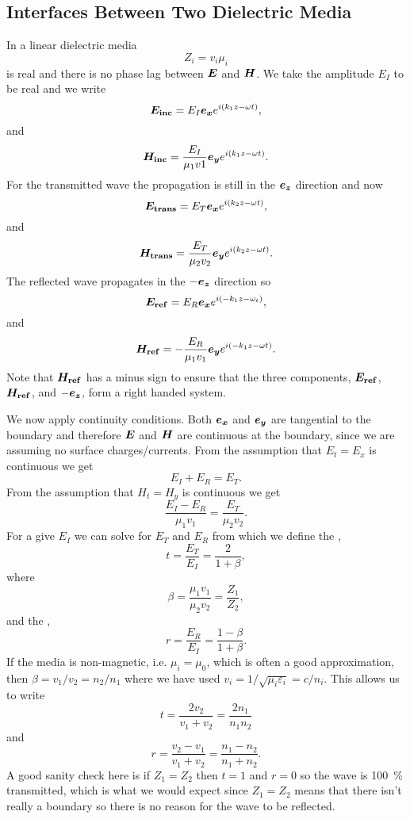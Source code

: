     \subsection{Interfaces Between Two Dielectric Media}
    In a linear dielectric media
    \[Z_i = v_i\mu_i\]
    is real and there is no phase lag between \(\bm{E}\) and \(\bm{H}\).
    We take the amplitude \(E_I\) to be real and we write
    \[\bm{E_{\mathrm{inc}}} = E_I\bm{e_{x}}e^{i(k_1z - \omega t)},\]
    and
    \[\bm{H_{\mathrm{inc}}} = \frac{E_I}{\mu_1v1}\bm{e_{y}}e^{i(k_1z - \omega t)}.\]
    For the transmitted wave the propagation is still in the \(\bm{e_{z}}\) direction and now
    \[\bm{E_{\mathrm{trans}}} = E_T\bm{e_{x}}e^{i(k_2z - \omega t)},\]
    and
    \[\bm{H_{\mathrm{trans}}} = \frac{E_T}{\mu_2v_2}\bm{e_{y}}e^{i(k_2z - \omega t)}.\]
    The reflected wave propagates in the \(-\bm{e_{z}}\) direction so
    \[\bm{E_{\mathrm{ref}}} = E_R\bm{e_{x}}e^{i(-k_1z - \omega_t)},\]
    and
    \[\bm{H_{\mathrm{ref}}} = -\frac{E_R}{\mu_1v_1}\bm{e_{y}}e^{i(-k_1z - \omega t)}.\]
    Note that \(\bm{H_{\mathrm{ref}}}\) has a minus sign to ensure that the three components, \(\bm{E_{\mathrm{ref}}}\), \(\bm{H_{\mathrm{ref}}}\), and \(-\bm{e_{z}}\), form a right handed system.
    
    We now apply continuity conditions.
    Both \(\bm{e_{x}}\) and \(\bm{e_{y}}\) are tangential to the boundary and therefore \(\bm{E}\) and \(\bm{H}\) are continuous at the boundary, since we are assuming no surface charges/currents.
    From the assumption that \(E_t = E_x\) is continuous we get
    \[E_I + E_R = E_T.\]
    From the assumption that \(H_t = H_y\) is continuous we get
    \[\frac{E_I - E_R}{\mu_1v_1} = \frac{E_T}{\mu_2v_2}.\]
    For a give \(E_I\) we can solve for \(E_T\) and \(E_R\) from which we define the ,
    \[t = \frac{E_T}{E_I} = \frac{2}{1 + \beta},\]
    where
    \[\beta = \frac{\mu_1v_1}{\mu_2v_2} = \frac{Z_1}{Z_2},\]
    and the ,
    \[r = \frac{E_R}{E_I} = \frac{1 - \beta}{1 + \beta}.\]
    If the media is non-magnetic, i.e. \(\mu_i = \mu_0\), which is often a good approximation, then \(\beta = v_1/v_2 = n_2/n_1\) where we have used \(v_i = 1/\sqrt{\mu_i\varepsilon_i} = c/n_i\).
    This allows us to write
    \[t = \frac{2v_2}{v_1 + v_2} = \frac{2n_1}{n_1 n_2}\]
    and
    \[r = \frac{v_2 - v_1}{v_1 + v_2} = \frac{n_1 - n_2}{n_1 + n_2}.\]
    A good sanity check here is if \(Z_1 = Z_2\) then \(t = 1\) and \(r = 0\) so the wave is \SI{100}{\percent} transmitted, which is what we would expect since \(Z_1 = Z_2\) means that there isn't really a boundary so there is no reason for the wave to be reflected.
    
